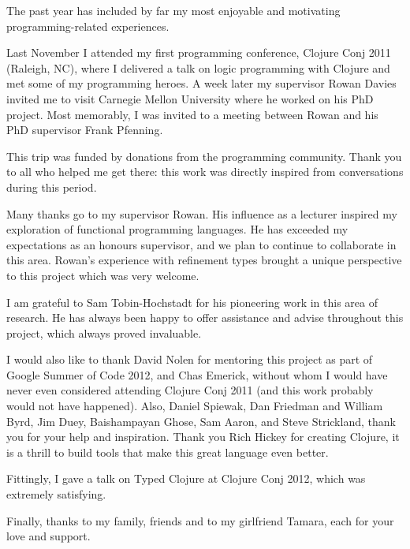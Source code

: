 \documentclass{cshonours}
\begin{document}
\begin{acknowledgements}

The past year has included by far my most enjoyable and motivating programming-related experiences.

Last November I attended my first programming conference, Clojure Conj 2011 (Raleigh, NC),
where I delivered a talk on logic programming with Clojure and met some of my programming heroes.
A week later my supervisor Rowan Davies invited me to visit Carnegie Mellon University
where he worked on his PhD project. Most memorably, I was invited to a meeting between
Rowan and his PhD supervisor Frank Pfenning.

This trip was funded by donations from the programming community. Thank you to all who helped me get there:
this work was directly inspired from conversations during this period.

Many thanks go to my supervisor Rowan. His influence as a lecturer inspired my exploration of
functional programming languages. He has exceeded my expectations as an honours supervisor,
and we plan to continue to collaborate in this area.
Rowan's experience with refinement types brought a unique perspective to this project
which was very welcome.

I am grateful to Sam Tobin-Hochstadt for his pioneering work in this area of research.
He has always been happy to offer assistance and advise throughout this project, which always proved invaluable.

I would also like to thank David Nolen for mentoring this project as part of Google Summer of Code 2012,
and Chas Emerick, without whom I would have never even considered attending Clojure Conj 2011
(and this work probably would not have happened).
Also, Daniel Spiewak, Dan Friedman and William Byrd, Jim Duey, Baishampayan Ghose, Sam Aaron, and
Steve Strickland, thank you for your help and inspiration.
Thank you Rich Hickey for creating Clojure, it is a thrill to build tools that make
this great language even better.

Fittingly, I gave a talk on Typed Clojure at Clojure Conj 2012, which was extremely satisfying.

Finally, thanks to my family, friends and to my girlfriend Tamara, each for your love and support.

\end{acknowledgements}

\tableofcontents




\end{document}
